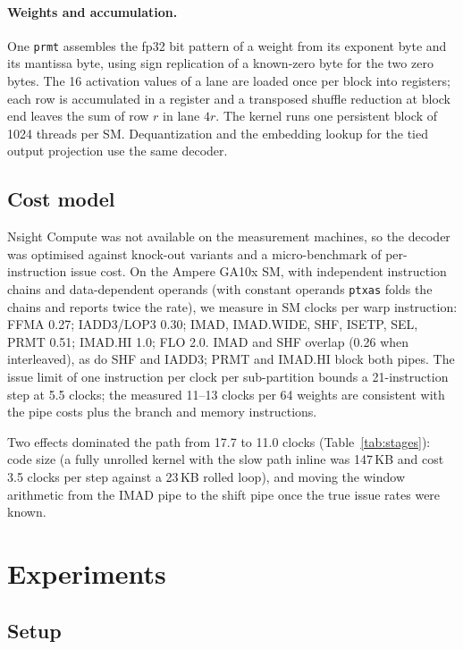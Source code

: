 \documentclass[11pt]{article}
\begin{document}
\paragraph{Weights and accumulation.} One \texttt{prmt} assembles the fp32 bit pattern of a weight from its
exponent byte and its mantissa byte, using sign replication of a known-zero byte for the two zero bytes.
The 16 activation values of a lane are loaded once per block into registers; each row is accumulated in
a register and a transposed shuffle reduction at block end leaves the sum of row $r$ in lane $4r$. The
kernel runs one persistent block of 1024 threads per SM. Dequantization and the embedding lookup for the
tied output projection use the same decoder.

\subsection{Cost model}
\label{sec:cost}

Nsight Compute was not available on the measurement machines, so the decoder was optimised against
knock-out variants and a micro-benchmark of per-instruction issue cost. On the Ampere GA10x SM, with
independent instruction chains and data-dependent operands (with constant operands \texttt{ptxas} folds
the chains and reports twice the rate), we measure in SM clocks per warp instruction: FFMA 0.27;
IADD3/LOP3 0.30; IMAD, IMAD.WIDE, SHF, ISETP, SEL, PRMT 0.51; IMAD.HI 1.0; FLO 2.0. IMAD and SHF overlap
(0.26 when interleaved), as do SHF and IADD3; PRMT and IMAD.HI block both pipes. The issue limit of one
instruction per clock per sub-partition bounds a 21-instruction step at 5.5 clocks; the measured 11--13
clocks per 64 weights are consistent with the pipe costs plus the branch and memory instructions.

Two effects dominated the path from 17.7 to 11.0 clocks (Table~\ref{tab:stages}): code size (a fully
unrolled kernel with the slow path inline was 147\,KB and cost 3.5 clocks per step against a 23\,KB rolled
loop), and moving the window arithmetic from the IMAD pipe to the shift pipe once the true issue rates
were known.

\section{Experiments}

\subsection{Setup}
\end{document}

